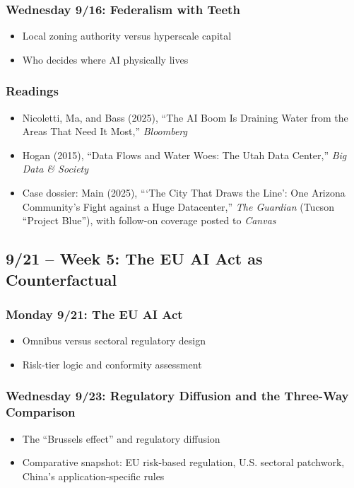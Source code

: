 \documentclass[12pt]{article}
\begin{document}
    \subsubsection*{Wednesday 9/16: Federalism with Teeth}
        \begin{itemize}
            \item Local zoning authority versus hyperscale capital
            \item Who decides where AI physically lives
        \end{itemize}
    \subsubsection*{Readings}
        \begin{itemize}
            \item Nicoletti, Ma, and Bass (2025), ``The AI Boom Is Draining Water from the Areas That Need It Most,'' \emph{Bloomberg}
            \item Hogan (2015), ``Data Flows and Water Woes: The Utah Data Center,'' \emph{Big Data \& Society}
            \item Case dossier: Main (2025), ```The City That Draws the Line': One Arizona Community's Fight against a Huge Datacenter,'' \emph{The Guardian} (Tucson ``Project Blue''), with follow-on coverage posted to \emph{Canvas}
        \end{itemize}

\subsection*{9/21 -- Week 5: The EU AI Act as Counterfactual}
    \subsubsection*{Monday 9/21: The EU AI Act}
        \begin{itemize}
            \item Omnibus versus sectoral regulatory design
            \item Risk-tier logic and conformity assessment
        \end{itemize}
    \subsubsection*{Wednesday 9/23: Regulatory Diffusion and the Three-Way Comparison}
        \begin{itemize}
            \item The ``Brussels effect'' and regulatory diffusion
            \item Comparative snapshot: EU risk-based regulation, U.S. sectoral patchwork, China's application-specific rules
        \end{itemize}
\end{document}

